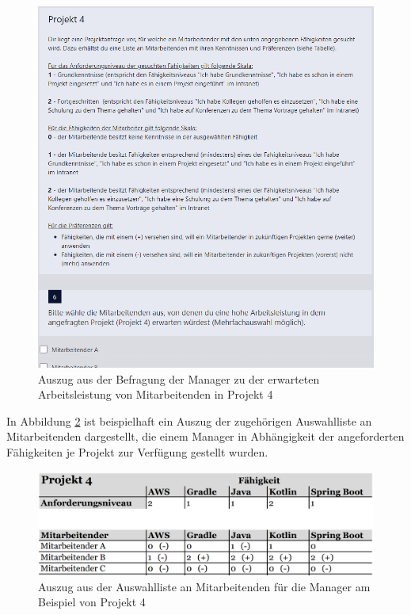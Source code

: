 \begin{figure}[H]
    \centering
	\includegraphics[width=1\textwidth]{gfx/befragung-arbeitsleistung.png}
	\caption[Auszug aus der Befragung der Manager zu der erwarteten Arbeitsleistung von Mitarbeitenden in Projekt 4]{Auszug aus der Befragung der Manager zu der erwarteten Arbeitsleistung von Mitarbeitenden in Projekt 4}
	\label{fig:methodik:abb6}
\end{figure}

In Abbildung \ref{fig:methodik:abb7} ist beispielhaft ein Auszug der zugehörigen Auswahlliste an Mitarbeitenden dargestellt, die einem Manager in Abhängigkeit der angeforderten Fähigkeiten je Projekt zur Verfügung gestellt wurden.

\begin{figure}[H]
    \centering
	\includegraphics[width=1\textwidth]{gfx/befragung-arbeitsleistung-liste-ma.png}
	\caption[Auszug aus der Auswahlliste an Mitarbeitenden für die Manager am Beispiel von Projekt 4]{Auszug aus der Auswahlliste an Mitarbeitenden für die Manager am Beispiel von Projekt 4}
	\label{fig:methodik:abb7}
\end{figure}

